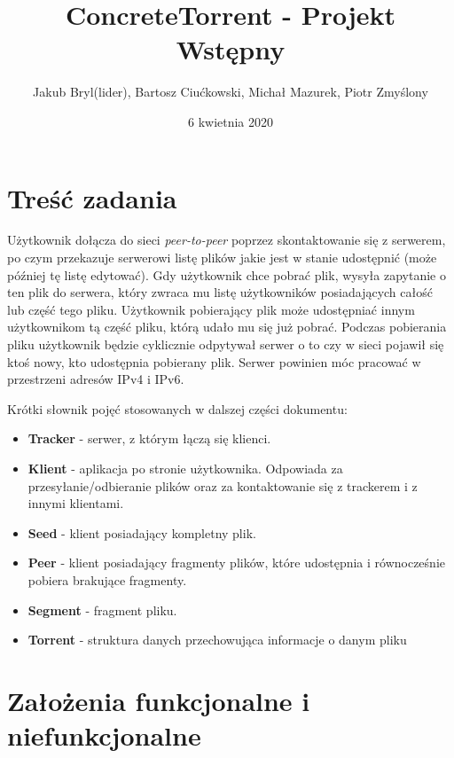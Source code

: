 \documentclass[11pt]{article}
\title{ConcreteTorrent - Projekt Wstępny}
\author{Jakub Bryl(lider), Bartosz Ciućkowski, Michał Mazurek, Piotr Zmyślony}
\date{6 kwietnia 2020} %
\begin{document}
	\maketitle
	\setcounter{secnumdepth}{3}
	\setcounter{tocdepth}{3}
	\tableofcontents
	\clearpage
\section{Treść zadania}
Użytkownik dołącza do sieci \textsl{peer-to-peer} poprzez skontaktowanie się z serwerem, po czym przekazuje serwerowi listę plików jakie jest w stanie udostępnić (może później tę listę edytować). Gdy użytkownik chce pobrać plik, wysyła zapytanie o ten plik do serwera, który zwraca mu listę użytkowników posiadających całość lub część tego pliku. Użytkownik pobierający plik może udostępniać innym użytkownikom tą część pliku, którą udało mu się już pobrać. Podczas pobierania pliku użytkownik będzie cyklicznie odpytywał serwer o to czy w sieci pojawił się ktoś nowy, kto udostępnia pobierany plik. Serwer powinien móc pracować w przestrzeni adresów IPv4 i IPv6.

Krótki słownik pojęć stosowanych w dalszej części dokumentu:
\begin{itemize}
\item \textbf{Tracker} - serwer, z którym łączą się klienci.
\item \textbf{Klient} - aplikacja po stronie użytkownika. Odpowiada za przesyłanie/odbieranie plików oraz za kontaktowanie się z trackerem i z innymi klientami.
\item \textbf{Seed} - klient posiadający kompletny plik.
\item \textbf{Peer} - klient posiadający fragmenty plików, które udostępnia i równocześnie pobiera brakujące fragmenty.
\item \textbf{Segment} - fragment pliku.
\item \textbf{Torrent} - struktura danych przechowująca informacje o danym pliku
\end{itemize}

\section{Założenia funkcjonalne i niefunkcjonalne}
\end{document}
